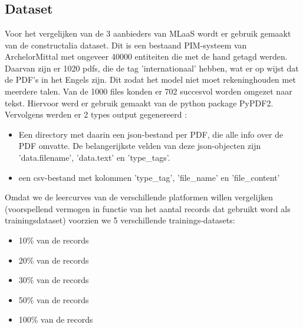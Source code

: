 
\chapter{}%
\label{ch:methodologie}


\section{Dataset}
Voor het vergelijken van de 3 aanbieders van MLaaS wordt er gebruik gemaakt van de constructalia dataset. Dit is een bestaand PIM-systeem van ArchelorMittal met ongeveer 40000 entiteiten die met de hand getagd werden. Daarvan zijn er 1020 pdfs, die de tag 'internationaal' hebben, wat er op wijst dat de PDF's in het Engels zijn. Dit zodat het model niet moet rekeninghouden met meerdere talen. Van de 1000 files konden er 702 succesvol worden omgezet naar tekst. Hiervoor werd er gebruik gemaakt van de python package PyPDF2. Vervolgens werden er 2 types output gegenereerd :
\begin{itemize}
    \item Een directory met daarin een json-bestand per PDF, die alle info over de PDF omvatte. De belangerijkste velden van deze json-objecten zijn 'data.filename', 'data.text' en 'type\_tags'.
    \item een csv-bestand met kolommen 'type\_tag', 'file\_name' en 'file\_content' 
\end{itemize}

Omdat we de leercurves van de verschillende platformen willen vergelijken (voorspellend vermogen in functie van het aantal records dat gebruikt word als trainingsdataset) voorzien we 5 verschillende trainings-datasets: 
\begin{itemize}
    \item 10\% van de records
    \item 20\% van de records
    \item 30\% van de records
    \item 50\% van de records
    \item 100\% van de records
\end{itemize}

